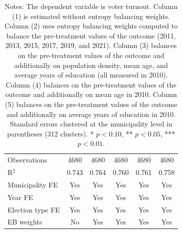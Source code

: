 \begin{table}[!h]
\begin{tabular}[t]{lccccc}
\addlinespace
Observations & 4680 & 4680 & 4680 & 4680 & 4680\\
R$^2$ & 0.743 & 0.764 & 0.760 & 0.761 & 0.758\\
Municipality FE & Yes & Yes & Yes & Yes & Yes\\
Year FE & Yes & Yes & Yes & Yes & Yes\\
Election type FE & Yes & Yes & Yes & Yes & Yes\\
EB weights & No & Yes & Yes & Yes & Yes\\
\hline
\end{tabular}
\vspace{0.3em}
\captionsetup{justification=justified, singlelinecheck=false}
\caption*{\footnotesize Notes: The dependent variable is voter turnout. Column (1) is estimated without entropy balancing weights. Column (2) uses entropy balancing weights computed to balance the pre-treatment values of the outcome (2011, 2013, 2015, 2017, 2019, and 2021). Column (3) balances on the pre-treatment values of the outcome and additionally on population density, mean age, and average years of education (all measured in 2010). Column (4) balances on the pre-treatment values of the outcome and additionally on mean age in 2010. Column (5) balances on the pre-treatment values of the outcome and additionally on average years of education in 2010. Standard errors clustered at the municipality level in parentheses (312 clusters). * $p<0.10$, ** $p<0.05$, *** $p<0.01$.}
\end{table}
